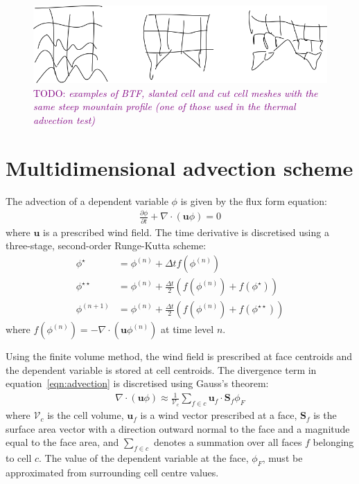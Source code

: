 \documentclass{article}
\newcommand{\TODO}[1]{\textcolor{purple}{TODO: \emph{#1}}}
\begin{document}
\begin{figure}
	\includegraphics[width=\textwidth]{meshComparison.png}
	\caption{\TODO{examples of BTF, slanted cell and cut cell meshes with the same steep mountain profile (one of those used in the thermal advection test)}}
\end{figure}

\section{Multidimensional advection scheme}

The advection of a dependent variable $\phi$ is given by the flux form equation:
\begin{align}
	\frac{\partial \phi}{\partial t} + \nabla \cdot \left( \bm{u} \phi \right) = 0 \label{eqn:advection}
\end{align}
where $\bm{u}$ is a prescribed wind field.  The time derivative is discretised using a three-stage, second-order Runge-Kutta scheme:
\begin{subequations}
\begin{align}
	\phi^\star &= \phi^{(n)} + \Delta t f(\phi^{(n)}) \\
	\phi^{\star\star} &= \phi^{(n)} + \frac{\Delta t}{2} \left( f(\phi^{(n)}) + f(\phi^\star) \right) \\
	\phi^{(n+1)} &= \phi^{(n)} + \frac{\Delta t}{2} \left( f(\phi^{(n)}) + f(\phi^{\star\star}) \right)
\end{align}
\end{subequations}
where \(f(\phi^{(n)}) = - \nabla \cdot (\bm{u} \phi^{(n)})\) at time level \(n\).

Using the finite volume method, the wind field is prescribed at face centroids and the dependent variable is stored at cell centroids.  The divergence term in equation~\eqref{eqn:advection} is discretised using Gauss's theorem:
\begin{align}
	\nabla \cdot \left( \bm{u} \phi \right) \approx \frac{1}{\mathcal{V}_c} \sum_{f \in c} \bm{u}_f \cdot \bm{S}_f \phi_F
\end{align}
where $\mathcal{V}_c$ is the cell volume, $\bm{u}_f$ is a wind vector prescribed at a face, ${\bm{S}_f}$ is the surface area vector with a direction outward normal to the face and a magnitude equal to the face area, and $\sum_{f \in c}$ denotes a summation over all faces $f$ belonging to cell $c$.  The value of the dependent variable at the face, $\phi_F$, must be approximated from surrounding cell centre values.
\end{document}
